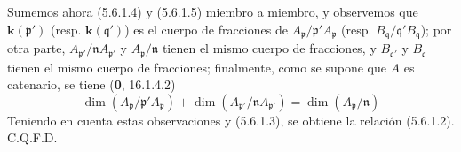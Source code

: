 Sumemos ahora (5.6.1.4) y (5.6.1.5) miembro a miembro, y observemos que
$\boldsymbol{k}(\mathfrak p')$ (resp. $\boldsymbol{k}(\mathfrak q')$) es el cuerpo de fracciones de
$A_{\mathfrak p}/\mathfrak p'A_{\mathfrak p}$ (resp.
$B_{\mathfrak q}/\mathfrak q'B_{\mathfrak q}$); por otra parte,
$A_{\mathfrak p'}/\mathfrak nA_{\mathfrak p'}$ y
$A_{\mathfrak p}/\mathfrak n$ tienen el mismo cuerpo de fracciones, y
$B_{\mathfrak q'}$ y $B_{\mathfrak q}$ tienen el mismo cuerpo de fracciones;
finalmente, como se supone que $A$ es catenario, se tiene (\textbf 0, 16.1.4.2)
\[
\dim(A_{\mathfrak p}/\mathfrak p'A_{\mathfrak p})
+\dim(A_{\mathfrak p'}/\mathfrak nA_{\mathfrak p'})
=\dim(A_{\mathfrak p}/\mathfrak n)
\]
Teniendo en cuenta estas observaciones y (5.6.1.3), se obtiene la relación
(5.6.1.2). C.Q.F.D.

